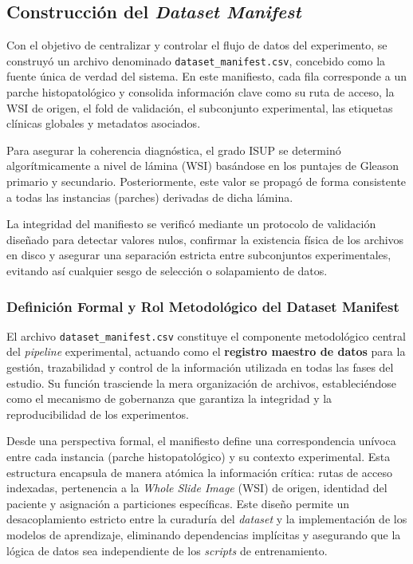 \subsection{Construcción del \textit{Dataset Manifest}}
\label{subsec:dataset_manifest}
Con el objetivo de centralizar y controlar el flujo de datos del experimento, se construyó un archivo denominado \texttt{dataset\_manifest.csv}, concebido como la fuente única de verdad del sistema. En este manifiesto, cada fila corresponde a un parche histopatológico y consolida información clave como su ruta de acceso, la WSI de origen, el fold de validación, el subconjunto experimental, las etiquetas clínicas globales y metadatos asociados.\newline

Para asegurar la coherencia diagnóstica, el grado ISUP se determinó algorítmicamente a nivel de lámina (WSI) basándose en los puntajes de Gleason primario y secundario. Posteriormente, este valor se propagó de forma consistente a todas las instancias (parches) derivadas de dicha lámina.\newline

La integridad del manifiesto se verificó mediante un protocolo de validación diseñado para detectar valores nulos, confirmar la existencia física de los archivos en disco y asegurar una separación estricta entre subconjuntos experimentales, evitando así cualquier sesgo de selección o solapamiento de datos.

\subsubsection{Definición Formal y Rol Metodológico del Dataset Manifest}
El archivo \texttt{dataset\_manifest.csv} constituye el componente metodológico central del \textit{pipeline} experimental, actuando como el \textbf{registro maestro de datos} para la gestión, trazabilidad y control de la información utilizada en todas las fases del estudio. Su función trasciende la mera organización de archivos, estableciéndose como el mecanismo de gobernanza que garantiza la integridad y la reproducibilidad de los experimentos.\newline

Desde una perspectiva formal, el manifiesto define una correspondencia unívoca entre cada instancia (parche histopatológico) y su contexto experimental. Esta estructura encapsula de manera atómica la información crítica: rutas de acceso indexadas, pertenencia a la \textit{Whole Slide Image} (WSI) de origen, identidad del paciente y asignación a particiones específicas. Este diseño permite un desacoplamiento estricto entre la curaduría del \textit{dataset} y la implementación de los modelos de aprendizaje, eliminando dependencias implícitas y asegurando que la lógica de datos sea independiente de los \textit{scripts} de entrenamiento.\newline

